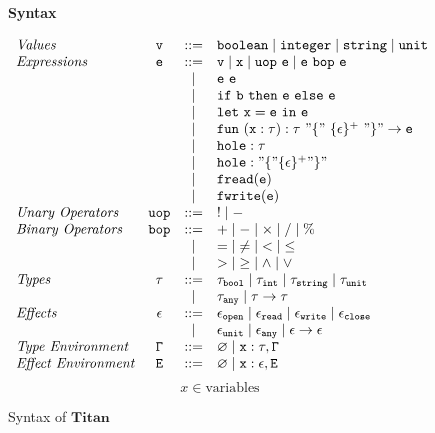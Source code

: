 \documentclass[12pt, a4paper, titlepage]{report}
\begin{document}
    \begin{figure}[htbp]
      \begin{flushleft}
        \textbf{Syntax}
      \end{flushleft}
      \[
      \centering
      \begin{array}{lccl}
        \emph{Values} &
          \mathtt{v} & ::= & \mathtt{boolean \mid integer \mid string \mid unit}\\
        \emph{Expressions} &
          \mathtt{e} & ::= & \mathtt{v} \mid \mathtt{x} \mid \mathtt{uop\ e \mid e\ bop\ e} \\
          & & \mid & \mathtt{e\ e} \\
          & & \mid & \mathtt{if}\ \mathtt{b}\ \mathtt{then}\ \mathtt{e}\ \mathtt{else}\ \mathtt{e} \\
          & & \mid & \mathtt{let}\ \mathtt{x = e}\ \mathtt{in}\ \mathtt{e} \\
          & & \mid & \mathtt{fun}\ \mathtt{(x : \tau) : \tau\ "\{"\ \{\epsilon\}^{+}\ "\}" \to e} \\
          & & \mid & \mathtt{hole : \tau} \\
          & & \mid & \mathtt{hole : "\{" \{\epsilon\}^{+} "\}"} \\
          & & \mid & \mathtt{fread(e)} \\
          & & \mid & \mathtt{fwrite(e)} \\
        \emph{Unary Operators} &
          \mathtt{uop} & ::= & ! \mid - \\
        \emph{Binary Operators} &
          \mathtt{bop} & ::= & \mathtt{+} \mid \mathtt{-} \mid \mathtt{\times} \mid \mathtt{/} \mid \mathtt{\%} \\
          & & \mid & \mathtt{=} \mid \mathtt{\neq} \mid \mathtt{<} \mid \mathtt{\leq} \\
          & & \mid & \mathtt{>} \mid \mathtt{\geq} \mid \mathtt{\land} \mid \mathtt{\lor} \\
        \emph{Types} &
          \mathtt{\tau} & ::= & \mathtt{\tau_{bool} \mid \tau_{int} \mid \tau_{string} \mid \tau_{unit}} \\
          & & \mid & \mathtt{\tau_{any} \mid \tau \to \tau} \\
        \emph{Effects} &
          \mathtt{\epsilon} & ::= & \mathtt{\epsilon_{open} \mid \epsilon_{read} \mid \epsilon_{write} \mid \epsilon_{close}} \\
          & & \mid & \mathtt{\epsilon_{unit} \mid \epsilon_{any} \mid \epsilon \to \epsilon} \\
        \emph{Type Environment} &
          \mathtt{\Gamma} & ::= & \mathtt{\varnothing \mid x : \tau, \Gamma} \\
        \emph{Effect Environment} &
          \mathtt{E} & ::= & \mathtt{\varnothing \mid x : \epsilon, E} \\
      \end{array}
      \]
      \[
        x \in \textrm{variables}
      \]
      \caption{Syntax of $\mathbf{Titan}$}
      \label{fig:syntax}
    \end{figure}
\end{document}
